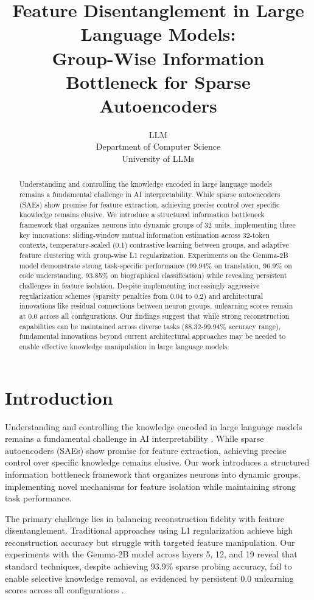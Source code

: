 \documentclass{article} %
\title{Feature Disentanglement in Large Language Models:\\
Group-Wise Information Bottleneck for Sparse Autoencoders}
\author{LLM\\
Department of Computer Science\\
University of LLMs\\
}
\begin{document}
\maketitle

\begin{abstract}
Understanding and controlling the knowledge encoded in large language models remains a fundamental challenge in AI interpretability. While sparse autoencoders (SAEs) show promise for feature extraction, achieving precise control over specific knowledge remains elusive. We introduce a structured information bottleneck framework that organizes neurons into dynamic groups of 32 units, implementing three key innovations: sliding-window mutual information estimation across 32-token contexts, temperature-scaled (0.1) contrastive learning between groups, and adaptive feature clustering with group-wise L1 regularization. Experiments on the Gemma-2B model demonstrate strong task-specific performance (99.94\% on translation, 96.9\% on code understanding, 93.85\% on biographical classification) while revealing persistent challenges in feature isolation. Despite implementing increasingly aggressive regularization schemes (sparsity penalties from 0.04 to 0.2) and architectural innovations like residual connections between neuron groups, unlearning scores remain at 0.0 across all configurations. Our findings suggest that while strong reconstruction capabilities can be maintained across diverse tasks (88.32-99.94\% accuracy range), fundamental innovations beyond current architectural approaches may be needed to enable effective knowledge manipulation in large language models.
\end{abstract}

\section{Introduction}
\label{sec:intro}

Understanding and controlling the knowledge encoded in large language models remains a fundamental challenge in AI interpretability \cite{gpt4}. While sparse autoencoders (SAEs) show promise for feature extraction, achieving precise control over specific knowledge remains elusive. Our work introduces a structured information bottleneck framework that organizes neurons into dynamic groups, implementing novel mechanisms for feature isolation while maintaining strong task performance.

The primary challenge lies in balancing reconstruction fidelity with feature disentanglement. Traditional approaches using L1 regularization achieve high reconstruction accuracy but struggle with targeted feature manipulation. Our experiments with the Gemma-2B model across layers 5, 12, and 19 reveal that standard techniques, despite achieving 93.9\% sparse probing accuracy, fail to enable selective knowledge removal, as evidenced by persistent 0.0 unlearning scores across all configurations \cite{radford2019language}.
\end{document}
